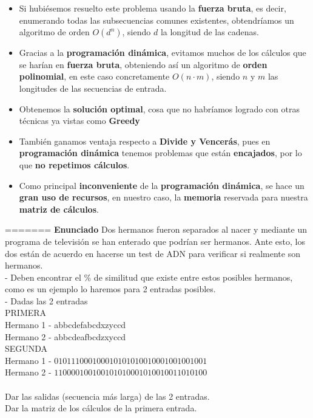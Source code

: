 \documentclass[10pt,a4paper]{article}
\begin{document}
\begin{itemize}
	\item Si hubiésemos resuelto este problema usando la \textbf{fuerza bruta}, es decir, enumerando todas las subsecuencias comunes existentes, obtendríamos un algoritmo de orden $O(d^n)$, siendo $d$ la longitud de las cadenas.
	\item Gracias a la \textbf{programación dinámica}, evitamos muchos de los cálculos que se harían en \textbf{fuerza bruta}, obteniendo así un algoritmo de \textbf{orden polinomial}, en este caso concretamente $O(n \cdot m)$, siendo $n$ y $m$ las longitudes de las secuencias de entrada.
	\item Obtenemos la \textbf{solución optimal}, cosa que no habríamos logrado con otras técnicas ya vistas como \textbf{Greedy}
	\item También ganamos ventaja respecto a \textbf{Divide y Vencerás}, pues en \textbf{programación dinámica} tenemos problemas que están \textbf{encajados}, por lo que \textbf{no repetimos cálculos}.
	\item Como principal \textbf{inconveniente} de la \textbf{programación dinámica}, se hace un \textbf{gran uso de recursos}, en nuestro caso, la \textbf{memoria} reservada para nuestra \textbf{matriz de cálculos}.
\end{itemize}
=======
\textbf{Enunciado} Dos hermanos fueron separados al nacer y mediante un programa de televisión se han enterado que podrían ser hermanos. Ante esto, los dos están de acuerdo en hacerse un test de ADN para verificar si realmente son hermanos.\\
- Deben encontrar el \% de similitud que existe entre estos posibles hermanos, como es un ejemplo lo haremos para 2 entradas posibles.\\
- Dadas las 2 entradas\\
PRIMERA \\
Hermano 1 - abbcdefabcdxzyccd \\
Hermano 2 - abbcdeafbcdzxyccd \\
SEGUNDA\\
Hermano 1 - $010111000100010101010010001001001001$\\
Hermano 2 - $110000100100101010001010010011010100$\\
\\
Dar las salidas (secuencia más larga) de las 2 entradas.\\
Dar la matriz de los cálculos de la primera entrada.
\\
\\
\end{document}

